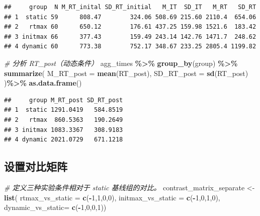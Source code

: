 \documentclass[
]{article}
\newenvironment{Shaded}{\begin{snugshade}}{\end{snugshade}}
\newcommand{\AttributeTok}[1]{\textcolor[rgb]{0.13,0.29,0.53}{#1}}
\newcommand{\CommentTok}[1]{\textcolor[rgb]{0.56,0.35,0.01}{\textit{#1}}}
\newcommand{\DecValTok}[1]{\textcolor[rgb]{0.00,0.00,0.81}{#1}}
\newcommand{\FunctionTok}[1]{\textcolor[rgb]{0.13,0.29,0.53}{\textbf{#1}}}
\newcommand{\NormalTok}[1]{#1}
\newcommand{\OtherTok}[1]{\textcolor[rgb]{0.56,0.35,0.01}{#1}}
\newcommand{\SpecialCharTok}[1]{\textcolor[rgb]{0.81,0.36,0.00}{\textbf{#1}}}
\begin{document}
\begin{verbatim}
##     group  N M_RT_inital SD_RT_initial   M_IT  SD_IT   M_RT   SD_RT
## 1  static 59      808.47        324.06 508.69 215.60 2110.4  654.06
## 2   rtmax 60      650.12        176.61 437.25 159.98 1521.6  183.42
## 3 initmax 66      377.43        159.49 243.14 142.76 1471.7  248.62
## 4 dynamic 60      773.38        752.17 348.67 233.25 2805.4 1199.82
\end{verbatim}

\begin{Shaded}
\begin{Highlighting}[]
\CommentTok{\# 分析 RT\_post（动态条件）}
\NormalTok{agg\_times }\SpecialCharTok{\%\textgreater{}\%}
  \FunctionTok{group\_by}\NormalTok{(group) }\SpecialCharTok{\%\textgreater{}\%}
  \FunctionTok{summarize}\NormalTok{(}
    \AttributeTok{M\_RT\_post =} \FunctionTok{mean}\NormalTok{(RT\_post),}
    \AttributeTok{SD\_RT\_post =} \FunctionTok{sd}\NormalTok{(RT\_post)}
\NormalTok{  )}\SpecialCharTok{\%\textgreater{}\%}
  \FunctionTok{as.data.frame}\NormalTok{()}
\end{Highlighting}
\end{Shaded}

\begin{verbatim}
##     group M_RT_post SD_RT_post
## 1  static 1291.0419   584.8519
## 2   rtmax  860.5363   190.2649
## 3 initmax 1083.3367   308.9183
## 4 dynamic 2021.0729   671.1218
\end{verbatim}

\subsection{设置对比矩阵}\label{ux8bbeux7f6eux5bf9ux6bd4ux77e9ux9635}

\begin{Shaded}
\begin{Highlighting}[]
\CommentTok{\# 定义三种实验条件相对于 static 基线组的对比。}
\NormalTok{contrast\_matrix\_separate }\OtherTok{\textless{}{-}} \FunctionTok{list}\NormalTok{(}
  \AttributeTok{rtmax\_vs\_static =} \FunctionTok{c}\NormalTok{(}\SpecialCharTok{{-}}\DecValTok{1}\NormalTok{,}\DecValTok{1}\NormalTok{,}\DecValTok{0}\NormalTok{,}\DecValTok{0}\NormalTok{),}
  \AttributeTok{initmax\_vs\_static =} \FunctionTok{c}\NormalTok{(}\SpecialCharTok{{-}}\DecValTok{1}\NormalTok{,}\DecValTok{0}\NormalTok{,}\DecValTok{1}\NormalTok{,}\DecValTok{0}\NormalTok{),}
  \AttributeTok{dynamic\_vs\_static=} \FunctionTok{c}\NormalTok{(}\SpecialCharTok{{-}}\DecValTok{1}\NormalTok{,}\DecValTok{0}\NormalTok{,}\DecValTok{0}\NormalTok{,}\DecValTok{1}\NormalTok{))}
\end{Highlighting}
\end{Shaded}
\end{document}
